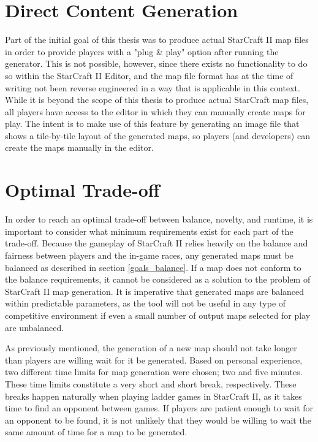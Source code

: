 \section{Direct Content Generation}
\label{goals_representation}
Part of the initial goal of this thesis was to produce actual StarCraft II map files in order to provide players with a "plug \& play" option after running the generator. This is not possible, however, since there exists no functionality to do so within the StarCraft II Editor, and the map file format has at the time of writing not been reverse engineered in a way that is applicable in this context. While it is beyond the scope of this thesis to produce actual StarCraft map files, all players have access to the editor in which they can manually create maps for play. The intent is to make use of this feature by generating an image file that shows a tile-by-tile layout of the generated maps, so players (and developers) can create the maps manually in the editor.

\section{Optimal Trade-off}
\label{goals_tradeoffs}
In order to reach an optimal trade-off between balance, novelty, and runtime, it is important to consider what minimum requirements exist for each part of the trade-off. Because the gameplay of StarCraft II relies heavily on the balance and fairness between players and the in-game races, any generated maps must be balanced as described in section \ref{goals_balance}. If a map does not conform to the balance requirements, it cannot be considered as a solution to the problem of StarCraft II map generation. It is imperative that generated maps are balanced within predictable parameters, as the tool will not be useful in any type of competitive environment if even a small number of output maps selected for play are unbalanced.

As previously mentioned, the generation of a new map should not take longer than players are willing wait for it be generated. Based on personal experience, two different time limits for map generation were chosen; two and five minutes. These time limits constitute a very short and short break, respectively. These breaks happen naturally when playing ladder games in StarCraft II, as it takes time to find an opponent between games. If players are patient enough to wait for an opponent to be found, it is not unlikely that they would be willing to wait the same amount of time for a map to be generated.

